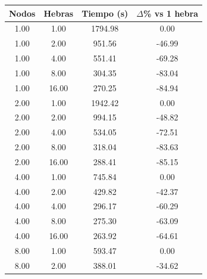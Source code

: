\begin{table}[ht]
    \centering
    \begin{tabular}{|c|c|c|c|}
        \hline
        \textbf{Nodos} & \textbf{Hebras} & \textbf{Tiempo (s)} & \textbf{$\Delta$\% vs 1 hebra} \\
        \hline
        1.00           & 1.00            & 1794.98             & 0.00                           \\
        1.00           & 2.00            & 951.56              & -46.99                         \\
        1.00           & 4.00            & 551.41              & -69.28                         \\
        1.00           & 8.00            & 304.35              & -83.04                         \\
        1.00           & 16.00           & 270.25              & -84.94                         \\
        2.00           & 1.00            & 1942.42             & 0.00                           \\
        2.00           & 2.00            & 994.15              & -48.82                         \\
        2.00           & 4.00            & 534.05              & -72.51                         \\
        2.00           & 8.00            & 318.04              & -83.63                         \\
        2.00           & 16.00           & 288.41              & -85.15                         \\
        4.00           & 1.00            & 745.84              & 0.00                           \\
        4.00           & 2.00            & 429.82              & -42.37                         \\
        4.00           & 4.00            & 296.17              & -60.29                         \\
        4.00           & 8.00            & 275.30              & -63.09                         \\
        4.00           & 16.00           & 263.92              & -64.61                         \\
        8.00           & 1.00            & 593.47              & 0.00                           \\
        8.00           & 2.00            & 388.01              & -34.62                         \\

\end{tabular}
\end{table}
